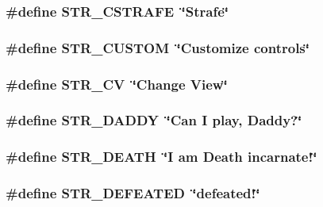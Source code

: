 \hypertarget{FOREIGN_8H_a40aa9ac83689de6bdf9331bc7486b170}{
\subsubsection[{STR\_\-CSTRAFE}]{\setlength{\rightskip}{0pt plus 5cm}\#define STR\_\-CSTRAFE~\char`\"{}Strafe\char`\"{}}}
\label{FOREIGN_8H_a40aa9ac83689de6bdf9331bc7486b170}
\hypertarget{FOREIGN_8H_a1e1030901163a82f9f294e72b36a6f75}{
\subsubsection[{STR\_\-CUSTOM}]{\setlength{\rightskip}{0pt plus 5cm}\#define STR\_\-CUSTOM~\char`\"{}Customize controls\char`\"{}}}
\label{FOREIGN_8H_a1e1030901163a82f9f294e72b36a6f75}
\hypertarget{FOREIGN_8H_a4efda92833cafd132148a2c45e750858}{
\subsubsection[{STR\_\-CV}]{\setlength{\rightskip}{0pt plus 5cm}\#define STR\_\-CV~\char`\"{}Change View\char`\"{}}}
\label{FOREIGN_8H_a4efda92833cafd132148a2c45e750858}
\hypertarget{FOREIGN_8H_af89da5a70620dd2033cdd060d3a7484d}{
\subsubsection[{STR\_\-DADDY}]{\setlength{\rightskip}{0pt plus 5cm}\#define STR\_\-DADDY~\char`\"{}Can I play, Daddy?\char`\"{}}}
\label{FOREIGN_8H_af89da5a70620dd2033cdd060d3a7484d}
\hypertarget{FOREIGN_8H_a893348627a5f38f91d88352dc9e28ea4}{
\subsubsection[{STR\_\-DEATH}]{\setlength{\rightskip}{0pt plus 5cm}\#define STR\_\-DEATH~\char`\"{}I am Death incarnate!\char`\"{}}}
\label{FOREIGN_8H_a893348627a5f38f91d88352dc9e28ea4}
\hypertarget{FOREIGN_8H_a0047673716c48cf2c05d5eb4bb2c71db}{
\subsubsection[{STR\_\-DEFEATED}]{\setlength{\rightskip}{0pt plus 5cm}\#define STR\_\-DEFEATED~\char`\"{}defeated!\char`\"{}}}
